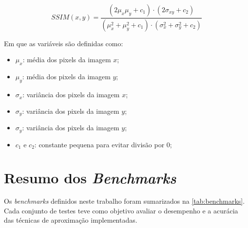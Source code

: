 \begin{equation}
	SSIM(x, y) = \frac{(2 \mu_x \mu_y + c_1) \cdot (2 \sigma_{xy} + c_2)}{(\mu_x^2 + \mu_y^2 + c_1) \cdot (\sigma_x^2 + \sigma_y^2 + c_2)}
	\label{eq:ssim}
\end{equation}

Em que as variáveis são definidas como:
\begin{itemize}
	\item $\mu_x$: média dos pixels da imagem $x$;
	\item $\mu_y$: média dos pixels da imagem $y$;
	\item $\sigma_x$: variância dos pixels da imagem $x$;
	\item $\sigma_y$: variância dos pixels da imagem $y$;
	\item $\sigma_y$: variância dos pixels da imagem $y$;
	\item $c_1$ e $c_2$: constante pequena para evitar divisão por $0$;
\end{itemize}

\section{Resumo dos \textit{Benchmarks}}\label{sec:resumo_exp}

Os \textit{benchmarks} definidos neste trabalho foram sumarizados na \autoref{tab:benchmarks}. Cada conjunto de testes teve como objetivo avaliar o desempenho e a acurácia das técnicas de aproximação implementadas.

